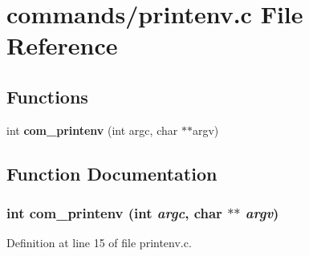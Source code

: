 \section{commands/printenv.c File Reference}
\label{printenv_8c}
\subsection*{Functions}
\begin{DoxyCompactItemize}
\item 
int {\bf com\_\-printenv} (int argc, char $\ast$$\ast$argv)
\end{DoxyCompactItemize}


\subsection{Function Documentation}
\subsubsection[{com\_\-printenv}]{\setlength{\rightskip}{0pt plus 5cm}int com\_\-printenv (int {\em argc}, \/  char $\ast$$\ast$ {\em argv})}\label{printenv_8c_a21d9a5967ecb59c1cf5cf78276aea452}


Definition at line 15 of file printenv.c.


